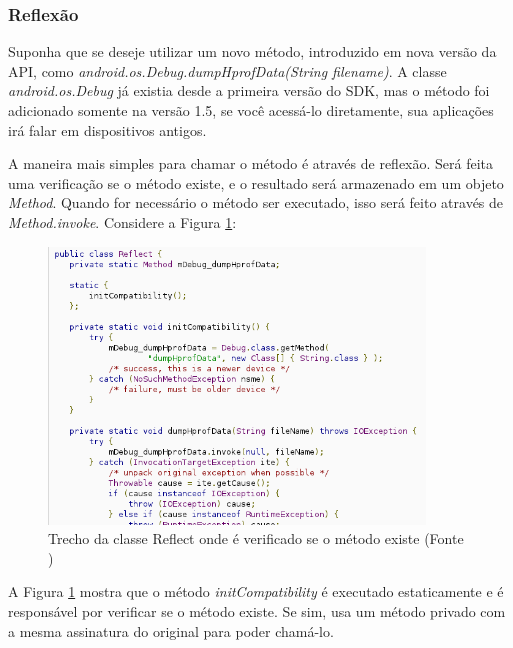 \subsubsection{Reflexão}

Suponha que se deseje utilizar um novo método, introduzido em nova versão da API,
como {\it android.os.Debug.dumpHprofData(String filename)}. A classe {\it android.os.Debug}
já existia desde a primeira versão do SDK, mas o método foi adicionado somente na versão 
1.5, se você acessá-lo diretamente, sua aplicações irá falar em dispositivos antigos.

A maneira mais simples para chamar o método é através de reflexão. Será feita uma 
verificação se o método existe, e o resultado será armazenado em um objeto {\it Method}.
Quando for necessário o método ser executado, isso será feito através de 
{\it Method.invoke}. Considere a Figura \ref{class_reflect1}:

\begin{figure}[h]
    \centering
    \includegraphics[width=10cm]{img/reflect1}
    \caption[Trecho da classe Reflect onde é verificado se o método existe]{Trecho da classe Reflect onde é verificado se o método existe (Fonte \cite{back_compat})}
    \label{class_reflect1}
\end{figure}

A Figura \ref{class_reflect1} mostra que o método {\it initCompatibility} é executado
 estaticamente e é responsável por verificar se o método existe. Se sim, usa um método 
 privado com a mesma assinatura do original para poder chamá-lo. 


